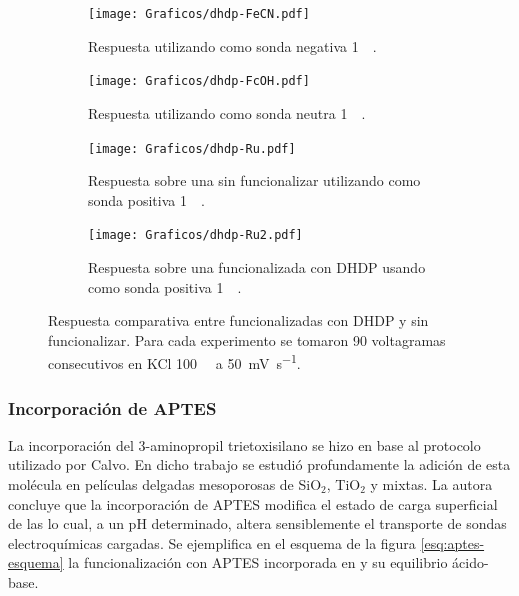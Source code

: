 					\begin{figure}[bh!]	
					\begin{subfigure}[t]{0.495\textwidth}
			 	    \texttt{[image: Graficos/dhdp-FeCN.pdf]}
			        \caption{Respuesta utilizando como sonda negativa \ferroferri\space \SI{1}{\milli\Molar}.}
			        \vspace*{4mm}
			        \label{fig:dhdp-vc-fe}
			        \end{subfigure}
			         \begin{subfigure}[t]{0.495\textwidth}
			 	    \texttt{[image: Graficos/dhdp-FcOH.pdf]}
			        \caption{Respuesta utilizando como sonda neutra \fc\space \SI{1}{\milli\Molar}.}
			        \vspace*{4mm}
			        \label{fig:dhdp-vc-fc}
			        \end{subfigure}
			        \begin{subfigure}[t]{0.495\textwidth}
			 	    \texttt{[image: Graficos/dhdp-Ru.pdf]}
			        \caption{Respuesta sobre una \pdmZ\space sin funcionalizar utilizando como sonda positiva \aminorutenio\space \SI{1}{\milli\Molar}.}
			        \label{fig:dhdp-vc-ru}
			        \end{subfigure}
			        \begin{subfigure}[t]{0.495\textwidth}
			 	    \texttt{[image: Graficos/dhdp-Ru2.pdf]}
			        \caption{Respuesta sobre una \pdmZ\space funcionalizada con DHDP usando como sonda positiva \aminorutenio\space \SI{1}{\milli\Molar}.}
			        \label{fig:dhdp-vc-ru2}
			        \end{subfigure}
			        \caption[Voltagramas de \pdmZ$^P_3$ con \aminorutenio, \fc\space y \ferroferri]{Respuesta comparativa entre \pdmZ\space funcionalizadas con DHDP y sin funcionalizar. Para cada experimento se tomaron 90 voltagramas consecutivos en KCl \SI{100}{\milli\Molar} a \SI{50}{\milli\volt\per\second}.}
			        \label{fig:dhdp-vc}
			      	\end{figure}

		\subsubsection{Incorporación de APTES}
			
			La incorporación del 3-aminopropil trietoxisilano se hizo en base al protocolo utilizado por Calvo\cite{Calvo20210}. En dicho trabajo se estudió profundamente la adición de esta molécula en películas delgadas mesoporosas de SiO$_2$, TiO$_2$ y mixtas. La autora concluye que la incorporación de APTES modifica el estado de carga superficial de las \pdm\space lo cual, a un pH determinado, altera sensiblemente el transporte de sondas electroquímicas cargadas. Se ejemplifica en el esquema de la figura \ref{esq:aptes-esquema} la funcionalización con APTES incorporada en \pdmZ\space y su equilibrio ácido-base.

